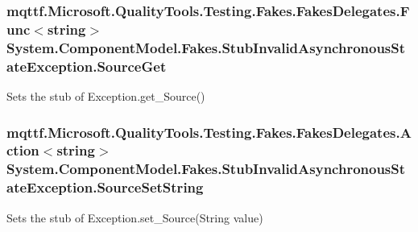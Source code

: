 \hypertarget{class_system_1_1_component_model_1_1_fakes_1_1_stub_invalid_asynchronous_state_exception_abcabc55ec2228937200850722fd087af}{
\subsubsection[{Source\-Get}]{\setlength{\rightskip}{0pt plus 5cm}mqttf.\-Microsoft.\-Quality\-Tools.\-Testing.\-Fakes.\-Fakes\-Delegates.\-Func$<$string$>$ System.\-Component\-Model.\-Fakes.\-Stub\-Invalid\-Asynchronous\-State\-Exception.\-Source\-Get}}\label{class_system_1_1_component_model_1_1_fakes_1_1_stub_invalid_asynchronous_state_exception_abcabc55ec2228937200850722fd087af}


Sets the stub of Exception.\-get\-\_\-\-Source()

\hypertarget{class_system_1_1_component_model_1_1_fakes_1_1_stub_invalid_asynchronous_state_exception_a0417907649866e676b8d30c83db7d68f}{
\subsubsection[{Source\-Set\-String}]{\setlength{\rightskip}{0pt plus 5cm}mqttf.\-Microsoft.\-Quality\-Tools.\-Testing.\-Fakes.\-Fakes\-Delegates.\-Action$<$string$>$ System.\-Component\-Model.\-Fakes.\-Stub\-Invalid\-Asynchronous\-State\-Exception.\-Source\-Set\-String}}\label{class_system_1_1_component_model_1_1_fakes_1_1_stub_invalid_asynchronous_state_exception_a0417907649866e676b8d30c83db7d68f}


Sets the stub of Exception.\-set\-\_\-\-Source(\-String value)

